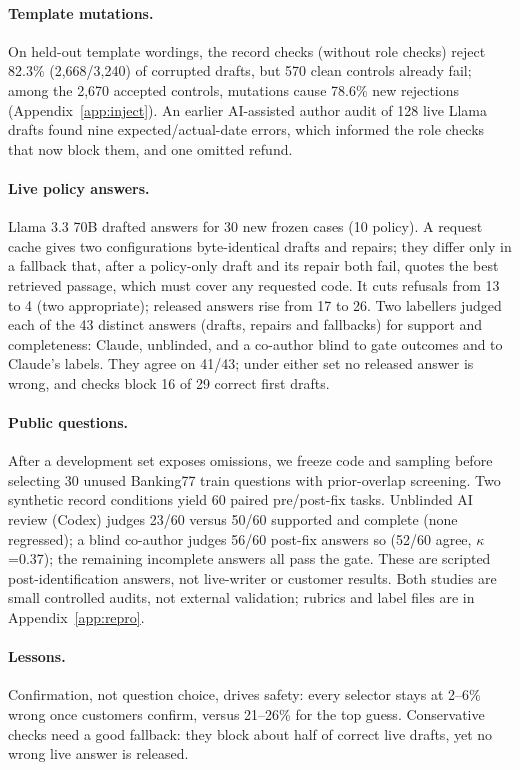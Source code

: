 \documentclass[11pt]{article}
\begin{document}
\paragraph{Template mutations.} On held-out template wordings, the record checks (without role
checks) reject 82.3\% (2,668/3,240) of corrupted drafts, but 570 clean controls already fail; among the 2,670 accepted controls,
mutations cause 78.6\% new rejections (Appendix~\ref{app:inject}). An earlier AI-assisted author audit
of 128 live Llama drafts found nine expected/actual-date errors, which informed the role checks that now
block them, and one omitted refund.

\paragraph{Live policy answers.} Llama 3.3 70B drafted answers for 30 new frozen cases (10 policy).
A request cache gives two configurations byte-identical drafts and repairs; they differ only in
a fallback that, after a policy-only draft and its repair both fail, quotes the best retrieved
passage, which must cover any requested code. It cuts refusals from 13 to 4 (two appropriate);
released answers rise from 17 to 26. Two labellers judged each of the 43 distinct answers
(drafts, repairs and fallbacks) for support and completeness: Claude, unblinded, and a co-author
blind to gate outcomes and to Claude's labels. They agree on 41/43; under either set no released
answer is wrong, and checks block 16 of 29 correct first drafts.

\paragraph{Public questions.} After a development set exposes omissions, we freeze code and sampling
before selecting 30 unused Banking77 train questions with prior-overlap screening. Two synthetic
record conditions yield 60 paired pre/post-fix tasks. Unblinded AI review (Codex) judges
23/60 versus 50/60 supported and complete (none regressed); a blind co-author
judges 56/60 post-fix answers so (52/60 agree, $\kappa$=0.37); the remaining incomplete
answers all pass the gate. These are scripted post-identification answers, not
live-writer or customer results. Both studies are small controlled audits, not external
validation; rubrics and label files are in Appendix~\ref{app:repro}.

\paragraph{Lessons.} Confirmation, not question choice, drives safety: every selector stays at
2--6\% wrong once customers confirm, versus 21--26\% for the top guess. Conservative checks need a
good fallback: they block about half of correct live drafts, yet no wrong live answer is released.
\end{document}
